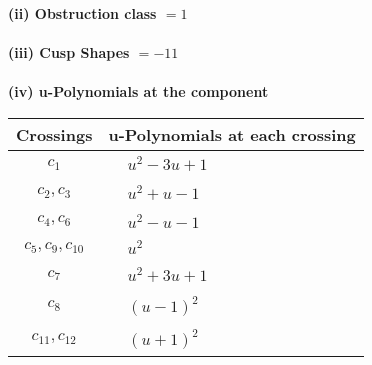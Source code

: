 \documentclass[1p]{elsarticle_modified}
\theoremstyle{definition}
\begin{document}
\flushleft \textbf{(ii) Obstruction class $= 1$}\\~\\
\flushleft \textbf{(iii) Cusp Shapes $= -11$}\\~\\
\newpage\renewcommand{\arraystretch}{1}
\flushleft \textbf{(iv) u-Polynomials at the component}\newline \\
\begin{tabular}{m{50pt}|m{274pt}}
Crossings & \hspace{64pt}u-Polynomials at each crossing \\
\hline $$\begin{aligned}c_{1}\end{aligned}$$&$\begin{aligned}
&u^2-3 u+1
\end{aligned}$\\
\hline $$\begin{aligned}c_{2},c_{3}\end{aligned}$$&$\begin{aligned}
&u^2+u-1
\end{aligned}$\\
\hline $$\begin{aligned}c_{4},c_{6}\end{aligned}$$&$\begin{aligned}
&u^2- u-1
\end{aligned}$\\
\hline $$\begin{aligned}c_{5},c_{9},c_{10}\end{aligned}$$&$\begin{aligned}
&u^2
\end{aligned}$\\
\hline $$\begin{aligned}c_{7}\end{aligned}$$&$\begin{aligned}
&u^2+3 u+1
\end{aligned}$\\
\hline $$\begin{aligned}c_{8}\end{aligned}$$&$\begin{aligned}
&(u-1)^2
\end{aligned}$\\
\hline $$\begin{aligned}c_{11},c_{12}\end{aligned}$$&$\begin{aligned}
&(u+1)^2
\end{aligned}$\\
\hline
\end{tabular}\\~\\
\end{document}
